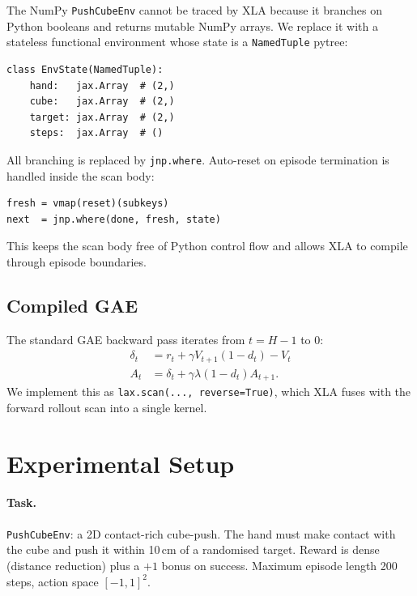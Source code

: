 \documentclass[11pt,twocolumn]{article}
\begin{document}
The NumPy \texttt{PushCubeEnv} cannot be traced by XLA because it branches on
Python booleans and returns mutable NumPy arrays. We replace it with a
stateless functional environment whose state is a \texttt{NamedTuple}
pytree:
\begin{footnotesize}\begin{verbatim}
class EnvState(NamedTuple):
    hand:   jax.Array  # (2,)
    cube:   jax.Array  # (2,)
    target: jax.Array  # (2,)
    steps:  jax.Array  # ()
\end{verbatim}\end{footnotesize}
All branching is replaced by \texttt{jnp.where}. Auto-reset on episode
termination is handled inside the scan body:
\begin{footnotesize}\begin{verbatim}
fresh = vmap(reset)(subkeys)
next  = jnp.where(done, fresh, state)
\end{verbatim}\end{footnotesize}
This keeps the scan body free of Python control flow and allows XLA to compile
through episode boundaries.

\subsection{Compiled GAE}

The standard GAE backward pass iterates from $t=H-1$ to $0$:
\begin{align*}
  \delta_t &= r_t + \gamma V_{t+1}(1-d_t) - V_t \\
  A_t &= \delta_t + \gamma\lambda(1-d_t)A_{t+1}.
\end{align*}
We implement this as \texttt{lax.scan(..., reverse=True)}, which XLA fuses
with the forward rollout scan into a single kernel.

\section{Experimental Setup}

\paragraph{Task.}
\texttt{PushCubeEnv}: a 2D contact-rich cube-push. The hand must make contact
with the cube and push it within 10\,cm of a randomised target. Reward is
dense (distance reduction) plus a $+1$ bonus on success. Maximum episode
length 200 steps, action space $[-1,1]^2$.
\end{document}
